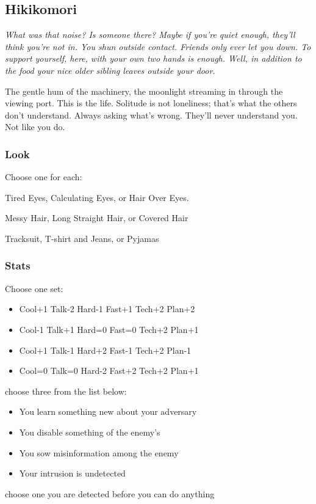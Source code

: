 \subsection{Hikikomori}
{\itshape What was that noise? Is someone there? Maybe if you're quiet enough, they'll think you're not in. You shun outside contact. Friends only ever let you down. To support yourself, here, with your own two hands is enough. Well, in addition to the food your nice older sibling leaves outside your door.

The gentle hum of the machinery, the moonlight streaming in through the viewing port. This is the life. Solitude is not loneliness; that's what the others don't understand. Always asking what's wrong. They'll never understand you. Not like you do.}

\subsubsection{Look}
Choose one for each:

Tired Eyes, Calculating Eyes, or Hair Over Eyes.

Messy Hair, Long Straight Hair, or Covered Hair

Tracksuit, T-shirt and Jeans, or Pyjamas

\subsubsection{Stats}
Choose one set:
\begin{itemize}
\setlength\itemsep{0em}
\item Cool+1 Talk-2 Hard-1 Fast+1 Tech+2 Plan+2
\item Cool-1 Talk+1 Hard=0 Fast=0 Tech+2 Plan+1
\item Cool+1 Talk-1 Hard+2 Fast-1 Tech+2 Plan-1
\item Cool=0 Talk=0 Hard-2 Fast+2 Tech+2 Plan+1
\end{itemize}

{choose three from the list below:
\begin{itemize}
\item You learn something new about your adversary
\item You disable something of the enemy's
\item You sow misinformation among the enemy
\item Your intrusion is undetected
\end{itemize}}
{choose one}
{you are detected before you can do anything}

